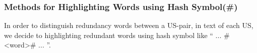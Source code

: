 \subsubsection*{Methods for Highlighting Words using Hash Symbol(\#)}
In order to distinguish redundancy words between a US-pair, in text of each US, we decide to highlighting redundant words using hash symbol like \enquote{ ... \#\textless word\textgreater\# ... }.

